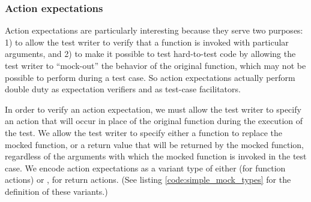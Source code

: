\subsubsection{Action expectations}

Action expectations are particularly interesting because they serve
two purposes: 1) to allow the test writer to verify that a function is
invoked with particular arguments, and 2) to make it possible to test
hard-to-test code by allowing the test writer to ``mock-out'' the
behavior of the original function, which may not be possible to
perform during a test case. So action expectations actually perform
double duty as expectation verifiers and as test-case facilitators.


In order to verify an action expectation, we must allow the test
writer to specify an action that will occur in place of the original
function during the execution of the test. We allow the test writer to
specify either a function to replace the mocked function, or a return
value that will be returned by the mocked function, regardless of the
arguments with which the mocked function is invoked in the test
case. We encode action expectations as a variant type of either
 (for function actions) or , for return
actions. (See listing \ref{code:simple_mock_types} for the definition
of these variants.)




